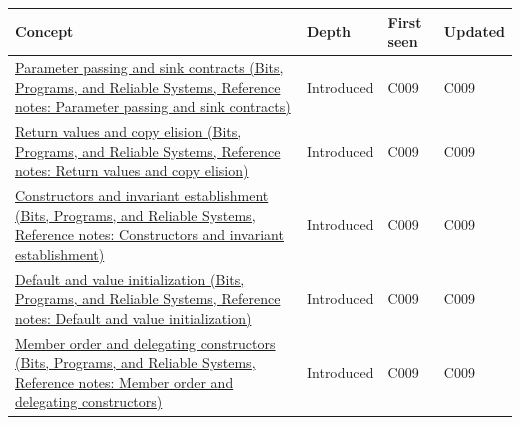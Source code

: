 {\def\LTcaptype{none} %
\begin{longtable}[]{@{}
  >{\raggedright\arraybackslash}p{}
  >{\raggedright\arraybackslash}p{}
  >{\raggedright\arraybackslash}p{}
  >{\raggedright\arraybackslash}p{}@{}}
\toprule\noalign{}
\begin{minipage}[b]{\linewidth}\raggedright
Concept
\end{minipage} & \begin{minipage}[b]{\linewidth}\raggedright
Depth
\end{minipage} & \begin{minipage}[b]{\linewidth}\raggedright
First seen
\end{minipage} & \begin{minipage}[b]{\linewidth}\raggedright
Updated
\end{minipage} \\
\midrule\noalign{}
\endhead
\bottomrule\noalign{}
\endlastfoot
\href{../01-Bits-Programs-and-Reliable-Systems/main.pdf\#nameddest=appendix-d5908f75721f}{Parameter passing and sink contracts (Bits, Programs, and Reliable Systems, Reference notes: Parameter passing and sink contracts)} & Introduced & C009 & C009 \\
\href{../01-Bits-Programs-and-Reliable-Systems/main.pdf\#nameddest=appendix-b08d3788c5c6}{Return values and copy elision (Bits, Programs, and Reliable Systems, Reference notes: Return values and copy elision)} & Introduced & C009 & C009 \\
\href{../01-Bits-Programs-and-Reliable-Systems/main.pdf\#nameddest=appendix-7f8ec83d0886}{Constructors and invariant establishment (Bits, Programs, and Reliable Systems, Reference notes: Constructors and invariant establishment)} & Introduced & C009 & C009 \\
\href{../01-Bits-Programs-and-Reliable-Systems/main.pdf\#nameddest=appendix-ba8c1a9fe03f}{Default and value initialization (Bits, Programs, and Reliable Systems, Reference notes: Default and value initialization)} & Introduced & C009 & C009 \\
\href{../01-Bits-Programs-and-Reliable-Systems/main.pdf\#nameddest=appendix-3cb49709605a}{Member order and delegating constructors (Bits, Programs, and Reliable Systems, Reference notes: Member order and delegating constructors)} & Introduced & C009 & C009 \\

\end{longtable}}
